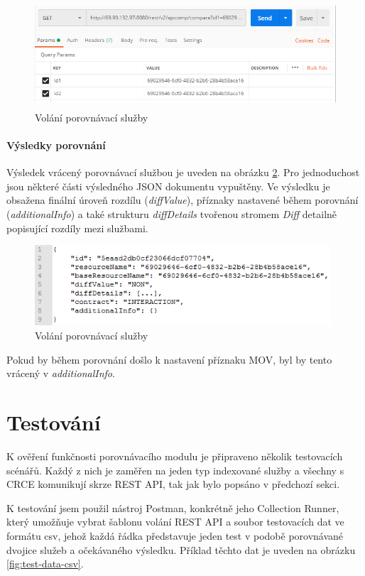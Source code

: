 \documentclass[czech,DP]{thesiskiv}
\begin{document}
\begin{figure}[h]
	\centering
	\includegraphics[height=4cm]{apicomp-call.png}
	\caption{Volání porovnávací služby}
	\label{fig:apicomp-call}
\end{figure}

\paragraph{Výsledky porovnání}
Výsledek vrácený porovnávací službou je uveden na obrázku \ref{fig:apicomp-res}. Pro jednoduchost jsou některé části výsledného JSON dokumentu vypuštěny. Ve výsledku je obsažena finální úroveň rozdílu (\textit{diffValue}), příznaky nastavené během porovnání (\textit{additionalInfo}) a také strukturu \textit{diffDetails} tvořenou stromem \textit{Diff} detailně popisující rozdíly mezi službami.

\begin{figure}[h]
	\centering
	\includegraphics[height=3cm]{apicomp-res.png}
	\caption{Volání porovnávací služby}
	\label{fig:apicomp-res}
\end{figure}

Pokud by během porovnání došlo k nastavení příznaku MOV, byl by tento vrácený v \textit{additionalInfo}.

\section{Testování}

K ověření funkčnosti porovnávacího modulu je připraveno několik testovacích scénářů. Každý z nich je zaměřen na jeden typ indexované služby a všechny s CRCE komunikují skrze REST API, tak jak bylo popsáno v předchozí sekci.

K testování jsem použil nástroj Postman, konkrétně jeho Collection Runner, který umožňuje vybrat šablonu volání REST API a soubor testovacích dat ve formátu csv, jehož každá řádka představuje jeden test v podobě porovnávané dvojice služeb a očekávaného výsledku. Příklad těchto dat je uveden na obrázku \ref{fig:test-data-csv}.
\end{document}
